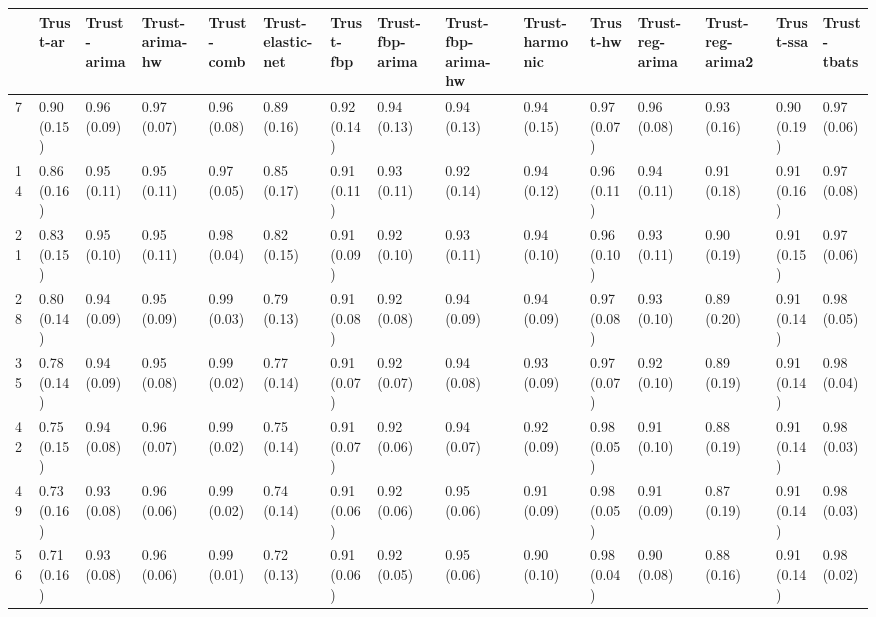 \begin{tabular}{lllllllllllllll}
\toprule
{} &     Trust-ar &  Trust-arima & Trust-arima-hw &   Trust-comb & Trust-elastic-net &    Trust-fbp & Trust-fbp-arima & Trust-fbp-arima-hw & Trust-harmonic &     Trust-hw & Trust-reg-arima & Trust-reg-arima2 &    Trust-ssa &  Trust-tbats \\
\midrule
7   &  0.90 (0.15) &  0.96 (0.09) &    0.97 (0.07) &  0.96 (0.08) &       0.89 (0.16) &  0.92 (0.14) &     0.94 (0.13) &        0.94 (0.13) &    0.94 (0.15) &  0.97 (0.07) &     0.96 (0.08) &      0.93 (0.16) &  0.90 (0.19) &  0.97 (0.06) \\
14  &  0.86 (0.16) &  0.95 (0.11) &    0.95 (0.11) &  0.97 (0.05) &       0.85 (0.17) &  0.91 (0.11) &     0.93 (0.11) &        0.92 (0.14) &    0.94 (0.12) &  0.96 (0.11) &     0.94 (0.11) &      0.91 (0.18) &  0.91 (0.16) &  0.97 (0.08) \\
21  &  0.83 (0.15) &  0.95 (0.10) &    0.95 (0.11) &  0.98 (0.04) &       0.82 (0.15) &  0.91 (0.09) &     0.92 (0.10) &        0.93 (0.11) &    0.94 (0.10) &  0.96 (0.10) &     0.93 (0.11) &      0.90 (0.19) &  0.91 (0.15) &  0.97 (0.06) \\
28  &  0.80 (0.14) &  0.94 (0.09) &    0.95 (0.09) &  0.99 (0.03) &       0.79 (0.13) &  0.91 (0.08) &     0.92 (0.08) &        0.94 (0.09) &    0.94 (0.09) &  0.97 (0.08) &     0.93 (0.10) &      0.89 (0.20) &  0.91 (0.14) &  0.98 (0.05) \\
35  &  0.78 (0.14) &  0.94 (0.09) &    0.95 (0.08) &  0.99 (0.02) &       0.77 (0.14) &  0.91 (0.07) &     0.92 (0.07) &        0.94 (0.08) &    0.93 (0.09) &  0.97 (0.07) &     0.92 (0.10) &      0.89 (0.19) &  0.91 (0.14) &  0.98 (0.04) \\
42  &  0.75 (0.15) &  0.94 (0.08) &    0.96 (0.07) &  0.99 (0.02) &       0.75 (0.14) &  0.91 (0.07) &     0.92 (0.06) &        0.94 (0.07) &    0.92 (0.09) &  0.98 (0.05) &     0.91 (0.10) &      0.88 (0.19) &  0.91 (0.14) &  0.98 (0.03) \\
49  &  0.73 (0.16) &  0.93 (0.08) &    0.96 (0.06) &  0.99 (0.02) &       0.74 (0.14) &  0.91 (0.06) &     0.92 (0.06) &        0.95 (0.06) &    0.91 (0.09) &  0.98 (0.05) &     0.91 (0.09) &      0.87 (0.19) &  0.91 (0.14) &  0.98 (0.03) \\
56  &  0.71 (0.16) &  0.93 (0.08) &    0.96 (0.06) &  0.99 (0.01) &       0.72 (0.13) &  0.91 (0.06) &     0.92 (0.05) &        0.95 (0.06) &    0.90 (0.10) &  0.98 (0.04) &     0.90 (0.08) &      0.88 (0.16) &  0.91 (0.14) &  0.98 (0.02) \\

\end{tabular}
